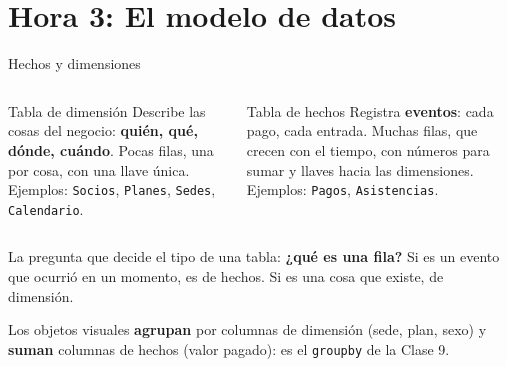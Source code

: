 \documentclass[aspectratio=169,11pt]{beamer}
\begin{document}
\section{Hora 3: El modelo de datos}
\begin{frame}[t]{Hechos y dimensiones}
  \begin{columns}[T,onlytextwidth]
    \begin{block}{Tabla de dimensión}
      \small Describe las cosas del negocio: \textbf{quién, qué, dónde,
      cuándo}. Pocas filas, una por cosa, con una llave única.\\[2pt]
      \footnotesize Ejemplos: \texttt{Socios}, \texttt{Planes},
      \texttt{Sedes}, \texttt{Calendario}.
    \end{block}
    \begin{alertblock}{Tabla de hechos}
      \small Registra \textbf{eventos}: cada pago, cada entrada. Muchas
      filas, que crecen con el tiempo, con números para sumar y llaves
      hacia las dimensiones.\\[2pt]
      \footnotesize Ejemplos: \texttt{Pagos}, \texttt{Asistencias}.
    \end{alertblock}
  \end{columns}
  \vspace{0.2cm}
  \small La pregunta que decide el tipo de una tabla: \textbf{¿qué es una
  fila?} Si es un evento que ocurrió en un momento, es de hechos. Si es una
  cosa que existe, de dimensión.
  \vspace{0.1cm}

  \footnotesize Los objetos visuales \textbf{agrupan} por columnas de
  dimensión (sede, plan, sexo) y \textbf{suman} columnas de hechos
  (valor pagado): es el \texttt{groupby} de la Clase 9.
\end{frame}
\end{document}
